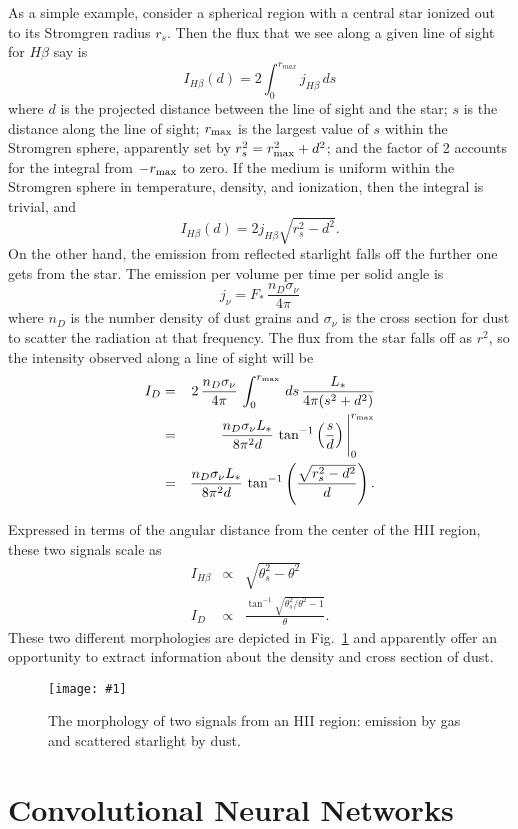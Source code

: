 \documentclass[prd,amsmath,aps,floats,amssymb, floatfix,
  superscriptaddress,nofootinbib]{revtex4-1}
\newcommand{\sfig}[2]{
\texttt{[image: \#1]}
        }
\newcommand{\Sfig}[2]{
    \begin{figure}[thbp]
    \sfig{Figures/#1.pdf}{.7\columnwidth}
    \caption{{\small #2}}
    \label{fig:#1}
    \end{figure}
}
\newcommand{\rf}[1]{\ref{fig:#1}}
\def\vs{\nonumber\\}
\numberwithin{equation}{section}
\newcommand\be{\begin{equation}}
\newcommand\ee{\end{equation}}
\def\bea{\begin{eqnarray}}
\def\eea{\end{eqnarray}}
\begin{document}
\begin{itemize}
 As a simple example, consider a spherical region with a central star ionized out to its Stromgren radius $r_s$. Then the flux that we see along a given line of sight for $H\beta$ say is
 \be
 I_{H\beta}(d) = 2\int_0^{r_{max}} j_{H\beta}\, ds
 \ee
 where $d$ is the projected distance between the line of sight and the star; $s$ is the distance along the line of sight; $r_{\rm max}$ is the largest value of $s$ within the Stromgren sphere, apparently set by $r_s^2=r_{\rm max}^2+d^2$; and the factor of 2 accounts for the integral from $-r_{\rm max}$ to zero. If the medium is uniform within the Stromgren sphere in temperature, density, and ionization, then the integral is trivial, and
 \be
 I_{H\beta}(d) = 2 j_{H\beta} \sqrt{r_s^2-d^2}
 .\ee
 On the other hand, the emission from reflected starlight falls off the further one gets from the star. The emission per volume per time  per solid angle is
 \be
 j_\nu = F_*\,\frac{n_D \sigma_\nu}{4\pi}
 \ee
 where $n_D$ is the number density of dust grains and $\sigma_\nu$ is the cross section for dust to scatter the radiation at that frequency. The flux from the star falls off as $r^2$, so the intensity observed along a line of sight will be
 \bea
 I_{D} &=& 2\,\frac{n_D \sigma_\nu}{4\pi}\,\int_0^{r_{\rm max}}\, ds\, \frac{L_*}{4\pi(s^2+d^2)}
\vs
&=&
\frac{n_D \sigma_\nu L_*}{8\pi^2 d}\,
\tan^{-1}\left(\frac{s}{d}\right)\Bigg\vert_0^{r_{\rm max}}\vs
&=&
\frac{n_D \sigma_\nu L_*}{8\pi^2 d}\,
\tan^{-1}\left(\frac{\sqrt{r_s^2-d^2}}{d}\right).
 \eea
 
 Expressed in terms of the angular distance from the center of the HII region, these two signals scale as
 \bea
 I_{H\beta} &\propto& \sqrt{\theta_s^2-\theta^2}
 \vs
 I_{D} &\propto& \frac{\tan^{-1}\sqrt{\theta_s^2/\theta^2 - 1}}{\theta}
 .\eea
 These two different morphologies are depicted in Fig.~\rf{morph} and apparently offer an opportunity to extract information about the density and cross section of dust.
 
 \Sfig{morph}{The morphology of two signals from an HII region: emission by gas and scattered starlight by dust.}
 
 
 \end{itemize}

 \section{Convolutional Neural Networks}
 
\end{document}

